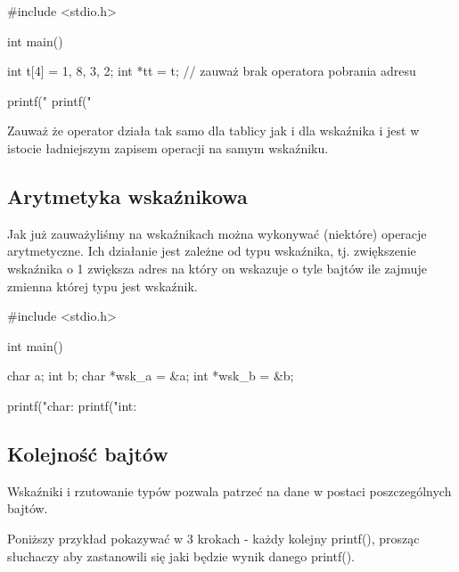 \documentclass{pdfBooklets}
\begin{document}
\begin{CodeFrame*}[c]{}
#include <stdio.h>

int main() {
  int t[4] = {1, 8, 3, 2};
  int *tt = t; // zauważ brak operatora pobrania adresu
  
  printf("%
  printf("%
}
\end{CodeFrame*}

Zauważ że operator  działa tak samo dla tablicy jak i dla wskaźnika i jest w istocie ładniejszym zapisem operacji  na samym wskaźniku.

\subsection{Arytmetyka wskaźnikowa}

Jak już zauważyliśmy na wskaźnikach można wykonywać (niektóre) operacje arytmetyczne. Ich działanie jest zależne od typu wskaźnika, tj. zwiększenie wskaźnika o 1 zwiększa adres na który on wskazuje o tyle bajtów ile zajmuje zmienna której typu jest wskaźnik.

\begin{CodeFrame*}[c]{}
#include <stdio.h>

int main() {
  char a;  int  b;
  char *wsk_a = &a;
  int  *wsk_b = &b;
  
  printf("char: %
  printf("int:  %
}
\end{CodeFrame*}

\subsection{Kolejność bajtów}

Wskaźniki i rzutowanie typów pozwala patrzeć na dane w postaci poszczególnych bajtów.

\begin{teacherOnly}
Poniższy przykład pokazywać w 3 krokach - każdy kolejny printf(), prosząc słuchaczy aby zastanowili się jaki będzie wynik danego printf().
\end{teacherOnly}
\end{document}
